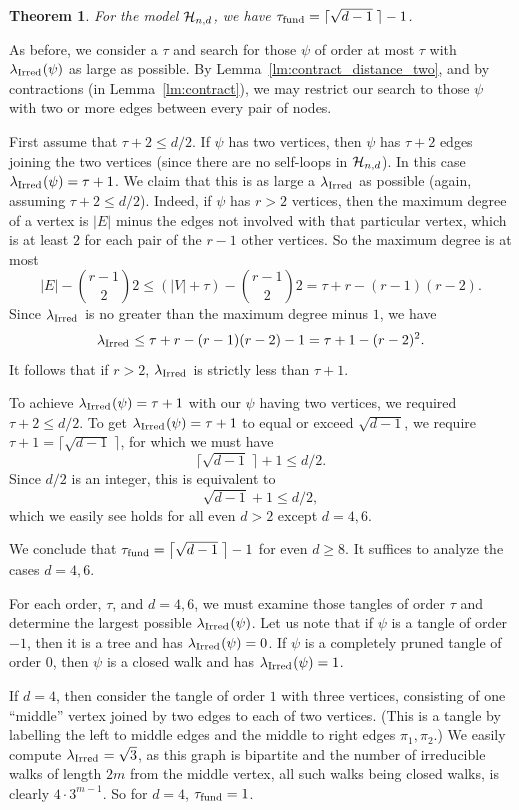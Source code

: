 \documentclass[12pt]{article}
\newtheorem{theorem}{Theorem}[section]
\newcommand{\ch}{{\cal H}}
\newcommand{\chnd}{\ch_{n,d}}
\newcommand{\fund}{{\rm fund}}
\newcommand{\taufund}{{\tau_\fund}}
\newcommand{\tang}{{\psi}}	%
\newcommand{\proof}{{\par\noindent {\bf Proof}\space\space}}
\newcommand{\ird}[1]{{\rm Irred}_{#1}}
\begin{document}
\begin{theorem}\label{th:taufund_chnd}
For the model $\chnd$, we have
$\taufund=\lceil \sqrt{d-1}\;\rceil-1$.
\end{theorem}
\proof As before, we consider a $\tau$ and search for those $\tang$ of order
at most $\tau$ with $\lambda_{\ird{}}(\tang)$ as large as possible.
By Lemma~\ref{lm:contract_distance_two}, 
and by contractions (in Lemma~\ref{lm:contract}),
we may restrict our search to those $\tang$ with
two or more edges between every pair of nodes.

First assume that $\tau+2\le d/2$.
If $\tang$ has two vertices, then $\tang$ has $\tau+2$ edges joining the
two vertices (since there are no self-loops in $\chnd$).
In this case
$\lambda_{\ird{}}(\tang)=\tau+1$.
We claim that this is as large
a $\lambda_{\ird{}}$ as possible (again, assuming $\tau+2\le d/2$).
Indeed, if $\tang$ has $r>2$ vertices,
then the maximum degree of a vertex is $|E|$ minus the edges not involved
with that particular vertex, which is at least $2$ for each pair of the
$r-1$ other vertices.  So the maximum degree is at most
$$
|E|-\binom{r-1}{2} 2 \le (|V|+\tau)-\binom{r-1}{2} 2 = \tau+r-(r-1)(r-2).
$$
Since $\lambda_{\ird{}}$ is no greater than the maximum degree minus $1$,
we have
$$
\lambda_{\ird{}} \le \tau+r-(r-1)(r-2)-1=\tau+1-(r-2)^2.
$$
It follows that if $r>2$, $\lambda_{\ird{}}$ is strictly less than
$\tau+1$.

To achieve $\lambda_{\ird{}}(\tang)=\tau+1$ with our $\tang$ having two vertices,
we required $\tau+2\le d/2$.  To get $\lambda_{\ird{}}(\tang)=\tau+1$ to equal or
exceed $\sqrt{d-1}$, we require $\tau+1=\bigl\lceil \sqrt{d-1} \;\bigr\rceil$,
for which we must have
$$
\bigl\lceil \sqrt{d-1} \;\bigr\rceil + 1 \le d/2.
$$
Since $d/2$ is an integer, this is equivalent to
$$
\sqrt{d-1}+1\le d/2,
$$
which we easily see holds for all even $d>2$ except $d=4,6$.

We conclude that $\taufund=\bigl\lceil \sqrt{d-1} \;\bigr\rceil-1$ 
for even $d\ge 8$.
It suffices to analyze the cases $d=4,6$.

For each order, $\tau$, and $d=4,6$, we must examine those tangles of
order $\tau$ and determine the largest possible $\lambda_{\ird{}}(\tang)$.
Let us note that if $\tang$ is a tangle of order $-1$, then it is a tree and
has $\lambda_{\ird{}}(\tang)=0$.  If $\tang$ is a completely pruned tangle of
order $0$, then $\tang$ is a closed walk and has $\lambda_{\ird{}}(\tang)=1$.

If $d=4$, then consider the tangle of order $1$ with three vertices,
consisting of one ``middle''
vertex joined by two edges to each of two vertices.
(This is a tangle by labelling the left to middle edges and the middle to
right edges $\pi_1,\pi_2$.)
We easily compute $\lambda_{\ird{}}=\sqrt{3}$, as this graph is
bipartite and the number of irreducible
walks of length $2m$ from the middle vertex,
all such walks being closed walks, is clearly $4\cdot 3^{m-1}$.
So for $d=4$, $\taufund=1$.
\end{document}
